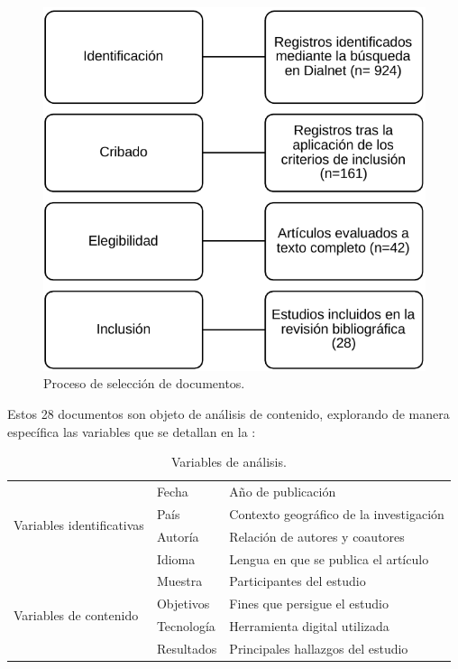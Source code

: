 \begin{figure}[h!]
\caption{Proceso de selección de documentos.}
\label{fig-01}
\centering
\includegraphics[width=.5\textwidth]{image1.pdf}
\end{figure}
       

Estos 28 documentos son objeto de análisis de contenido, explorando de
manera específica las variables que se detallan en la :

\begin{table}[h!]
\centering
\caption{Variables de análisis.}
\label{tab-02}
\begin{tabular}{p{3cm}lp{7cm}}
\toprule
\multirow{4}{=}{Variables identificativas} & Fecha& Año de publicación \\ 
  & País & Contexto geográfico de la investigación\\
  & Autoría & Relación de autores y coautores\\
  & Idioma & Lengua en que se publica el artículo\\
\midrule
\multirow{4}{=}{Variables de contenido} & Muestra & Participantes del estudio\\
  & Objetivos & Fines que persigue el estudio\\
  & Tecnología & Herramienta digital utilizada\\
  & Resultados & Principales hallazgos del estudio\\
\bottomrule
\end{tabular}
\end{table}


